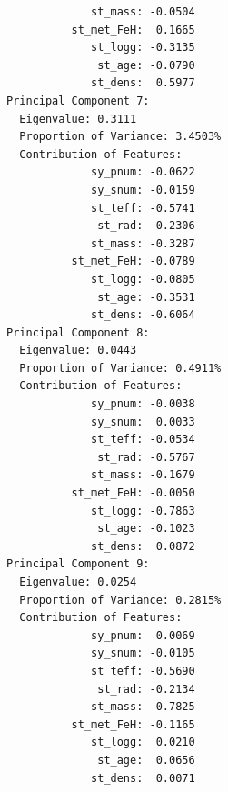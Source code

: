 \documentclass[preprint]{aastex631}
\begin{document}
\begin{verbatim}
             st_mass: -0.0504
          st_met_FeH:  0.1665
             st_logg: -0.3135
              st_age: -0.0790
             st_dens:  0.5977
Principal Component 7:
  Eigenvalue: 0.3111
  Proportion of Variance: 3.4503%
  Contribution of Features:
             sy_pnum: -0.0622
             sy_snum: -0.0159
             st_teff: -0.5741
              st_rad:  0.2306
             st_mass: -0.3287
          st_met_FeH: -0.0789
             st_logg: -0.0805
              st_age: -0.3531
             st_dens: -0.6064
Principal Component 8:
  Eigenvalue: 0.0443
  Proportion of Variance: 0.4911%
  Contribution of Features:
             sy_pnum: -0.0038
             sy_snum:  0.0033
             st_teff: -0.0534
              st_rad: -0.5767
             st_mass: -0.1679
          st_met_FeH: -0.0050
             st_logg: -0.7863
              st_age: -0.1023
             st_dens:  0.0872
Principal Component 9:
  Eigenvalue: 0.0254
  Proportion of Variance: 0.2815%
  Contribution of Features:
             sy_pnum:  0.0069
             sy_snum: -0.0105
             st_teff: -0.5690
              st_rad: -0.2134
             st_mass:  0.7825
          st_met_FeH: -0.1165
             st_logg:  0.0210
              st_age:  0.0656
             st_dens:  0.0071
\end{verbatim}


\end{document}
